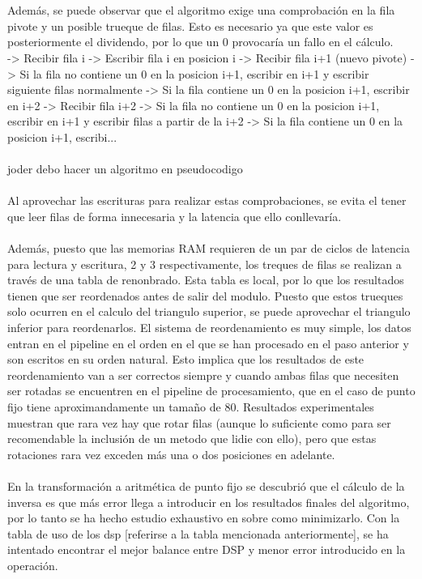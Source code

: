 \\
\\
Además, se puede observar que el algoritmo exige una comprobación en la fila pivote y un posible trueque de filas. Esto es necesario ya que este valor es posteriormente el dividendo, por lo que un 0 provocaría un fallo en el cálculo.
\\
-> Recibir fila i
-> Escribir fila i en posicion i
-> Recibir fila i+1 (nuevo pivote)
-> Si la fila no contiene un 0 en la posicion i+1, escribir en i+1 y escribir siguiente filas normalmente
-> Si la fila contiene un 0 en la posicion i+1, escribir en i+2
-> Recibir fila i+2
-> Si la fila no contiene un 0 en la posicion i+1, escribir en i+1 y escribir filas a partir de la i+2
-> Si la fila contiene un 0 en la posicion i+1, escribi...
\\
\\
joder debo hacer un algoritmo en pseudocodigo
\\
\\
Al aprovechar las escrituras para realizar estas comprobaciones, se evita el tener que leer filas de forma innecesaria y la latencia que ello conllevaría.
\\
\\
Además, puesto que las memorias RAM requieren de un par de ciclos de latencia para lectura y escritura, 2 y 3 respectivamente, los treques de filas se realizan a través de una tabla de renonbrado. Esta tabla es local, por lo que los resultados tienen que ser reordenados antes de salir del modulo. Puesto que estos trueques solo ocurren en el calculo del triangulo superior, se puede aprovechar el triangulo inferior para reordenarlos. El sistema de reordenamiento es muy simple, los datos entran en el pipeline en el orden en el que se han procesado en el paso anterior y son escritos en su orden natural. Esto implica que los resultados de este reordenamiento van a ser correctos siempre y cuando ambas filas que necesiten ser rotadas se encuentren en el pipeline de procesamiento, que en el caso de  punto fijo tiene aproximandamente un tamaño de 80. Resultados experimentales muestran que rara vez hay que rotar filas (aunque lo suficiente como para ser recomendable la inclusión de un metodo que lidie con ello), pero que estas rotaciones rara vez exceden más una o dos posiciones en adelante.
\\
\\
En la transformación a aritmética de punto fijo se descubrió que el cálculo de la inversa es que más error llega a introducir en los resultados finales del algoritmo, por lo tanto se ha hecho estudio exhaustivo en  sobre como minimizarlo. Con la tabla de uso de los dsp [referirse a la tabla mencionada anteriormente], se ha intentado encontrar el mejor balance entre DSP y menor error introducido en la operación.
